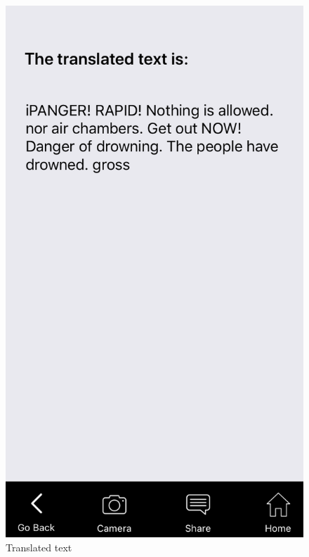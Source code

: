 \documentclass[12pt]{article}
\begin{document}
 \begin{figure} [H]
\centering
\begin{minipage}{.5\textwidth}
  \centering
  \includegraphics[width=0.9\linewidth]{media/3.PNG}
  \caption{Translated text}
  \label{fig:translated}
\end{minipage}%
\begin{minipage}{.5\textwidth}
  \centering

\end{minipage}
\end{figure}
\end{document}
